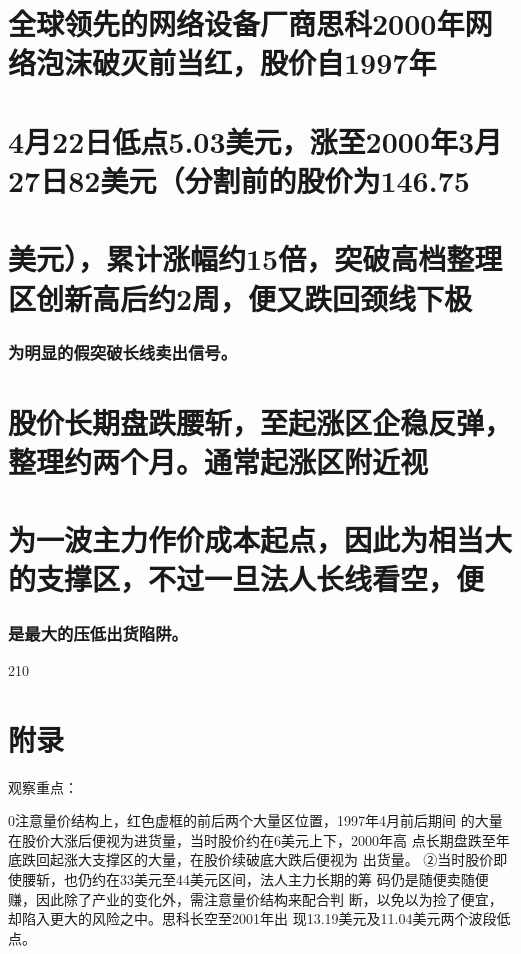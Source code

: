\documentclass{article}
\begin{document}
\section{全球领先的网络设备厂商思科2000年网络泡沫破灭前当红，股价自1997年}

\section{4月22日低点5.03美元，涨至2000年3月27日82美元（分割前的股价为146.75}

\section{美元），累计涨幅约15倍，突破高档整理区创新高后约2周，便又跌回颈线下极}

\subsubsection{为明显的假突破长线卖出信号。}

\section{股价长期盘跌腰斩，至起涨区企稳反弹，整理约两个月。通常起涨区附近视}

\section{为一波主力作价成本起点，因此为相当大的支撑区，不过一旦法人长线看空，便}

\subsubsection{是最大的压低出货陷阱。}

210

\clearpage

\section{附录}

观察重点：

0注意量价结构上，红色虚框的前后两个大量区位置，1997年4月前后期间 的大量在股价大涨后便视为进货量，当时股价约在6美元上下，2000年高 点长期盘跌至年底跌回起涨大支撑区的大量，在股价续破底大跌后便视为 出货量。 ②当时股价即使腰斩，也仍约在33美元至44美元区间，法人主力长期的筹 码仍是随便卖随便赚，因此除了产业的变化外，需注意量价结构来配合判 断，以免以为捡了便宜，却陷入更大的风险之中。思科长空至2001年出 现13.19美元及11.04美元两个波段低点。
\end{document}
